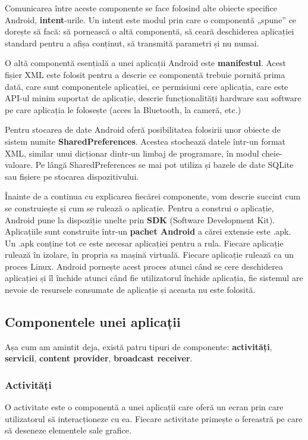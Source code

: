 \documentclass[12pt,a4paper]{article}
\begin{document}
Comunicarea între aceste componente se face folosind alte obiecte specifice Android, \textbf{intent}-urile. Un intent este modul prin care o componentă „spune” ce dorește să facă: să pornească o altă componentă, să ceară deschiderea aplicației standard pentru a afișa conținut, să transmită parametri și nu numai.

O altă componentă esențială a unei aplicații Android este \textbf{manifestul}. Acest fișier XML este folosit pentru a descrie ce componentă trebuie pornită prima dată, care sunt componentele aplicației, ce permisiuni cere aplicația, care este API-ul minim suportat de aplicație, descrie funcționalități hardware sau software pe care aplicația le folosește (acces la Bluetooth, la cameră, etc.)

Pentru stocarea de date Android oferă posibilitatea folosirii unor obiecte de sistem numite \textbf{SharedPreferences}. Acestea stochează datele într-un format XML, similar unui dicționar dintr-un limbaj de programare, în modul cheie-valoare. Pe lângă SharedPreferences se mai pot utiliza și bazele de date SQLite sau fișiere pe stocarea dispozitivului.

Înainte de a continua cu explicarea fiecărei componente, vom descrie succint cum se construiește și cum se rulează o aplicație. Pentru a construi o aplicație, Android pune la dispoziție unelte prin \textbf{SDK} (Software Development Kit). Aplicațiile sunt construite într-un \textbf{pachet Android} a cărei extensie este .apk. Un .apk conține tot ce este necesar aplicației pentru a rula. Fiecare aplicație rulează în izolare, în propria sa mașină virtuală. Fiecare aplicație rulează ca un proces Linux. Android pornește acest proces atunci când se cere deschiderea aplicației și îl închide atunci când fie utilizatorul închide aplicația, fie sistemul are nevoie de resursele consumate de aplicație și aceasta nu este folosită.

\newpage
\subsection{Componentele unei aplicații}
Așa cum am amintit deja, există patru tipuri de componente: \textbf{activități}, \textbf{servicii}, \textbf{content provider}, \textbf{broadcast receiver}.

\subsubsection{Activități}
O activitate este o componentă a unei aplicații care oferă un ecran prin care utilizatorul să interacționeze cu ea. Fiecare activitate primește o fereastră pe care să deseneze elementele sale grafice.
\end{document}
